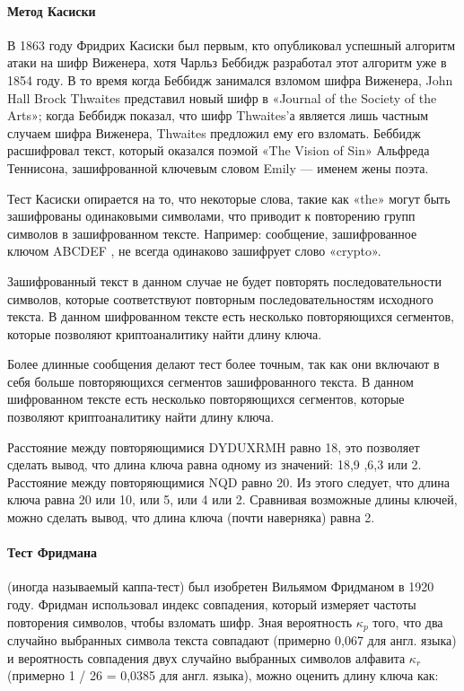 \paragraph{Метод Касиски}

В 1863 году Фридрих Касиски был первым, кто опубликовал успешный 
алгоритм атаки на шифр Виженера, хотя Чарльз Беббидж разработал 
этот алгоритм уже в 1854 году. В то время когда Беббидж занимался 
взломом шифра Виженера, John Hall Brock Thwaites представил новый 
шифр в «Journal of the Society of the Arts»; когда Беббидж показал,
что шифр Thwaites’а является лишь частным случаем шифра Виженера,
Thwaites предложил ему его взломать. Беббидж расшифровал текст,
который оказался поэмой «The Vision of Sin» Альфреда Теннисона,
зашифрованной ключевым словом Emily — именем жены поэта.

Тест Касиски опирается на то, что некоторые слова, такие как 
«the» могут быть зашифрованы одинаковыми символами, что приводит 
к повторению групп символов в зашифрованном тексте. Например: 
сообщение, зашифрованное ключом ABCDEF , не всегда одинаково 
зашифрует слово «crypto».

Зашифрованный текст в данном случае не будет повторять последовательности 
символов, которые соответствуют повторным последовательностям 
исходного текста. В данном шифрованном тексте есть несколько 
повторяющихся сегментов, которые позволяют криптоаналитику найти 
длину ключа.

Более длинные сообщения делают тест более точным, так как они 
включают в себя больше повторяющихся сегментов зашифрованного 
текста. В данном шифрованном тексте есть несколько повторяющихся 
сегментов, которые позволяют криптоаналитику найти длину ключа.

Расстояние между повторяющимися DYDUXRMH равно 18, это позволяет 
сделать вывод, что длина ключа равна одному из значений: 18,9
,6,3 или 2. Расстояние между повторяющимися NQD равно 20. Из 
этого следует, что длина ключа равна 20 или 10, или 5, или 4 
или 2. Сравнивая возможные длины ключей, можно сделать вывод, 
что длина ключа (почти наверняка) равна 2.

\paragraph{Тест Фридмана}

(иногда называемый каппа-тест) был изобретен Вильямом 
Фридманом в 1920 году. Фридман использовал индекс совпадения, 
который измеряет частоты повторения символов, чтобы взломать 
шифр. Зная вероятность $\kappa_p$ того, что два случайно выбранных 
символа текста совпадают (примерно 0,067 для англ. языка) и вероятность 
совпадения двух случайно выбранных символов алфавита $\kappa_r$ 
(примерно 1 / 26 = 0,0385 для англ. языка), можно оценить длину 
ключа как:

